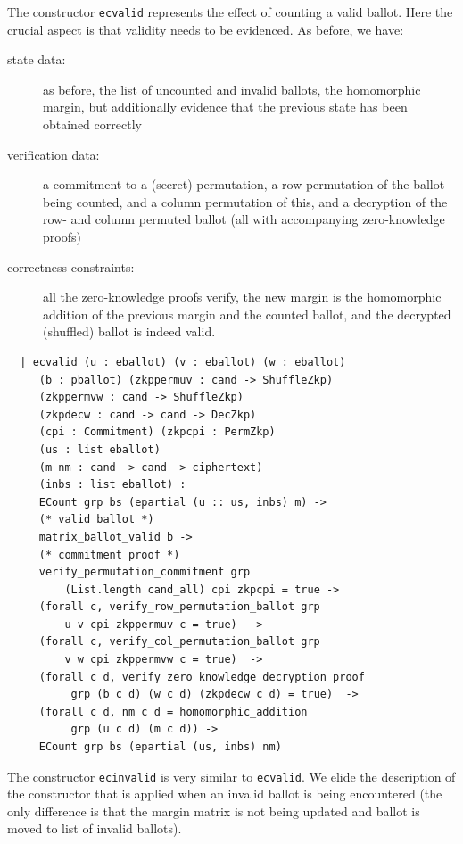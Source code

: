 The constructor \texttt{ecvalid} represents the effect of counting a
valid ballot. Here the crucial aspect is that validity needs to be
evidenced. As before, we have:
\begin{description}
  \item[state data:] as before, the list of uncounted and invalid
  ballots, the homomorphic margin, but additionally evidence that
  the previous state has been obtained correctly
  \item[verification data:]
  a commitment to a (secret) permutation, a row permutation of the
  ballot being counted, and a column permutation of this, and a
  decryption of the row- and column permuted ballot (all with
  accompanying zero-knowledge proofs)
  \item[correctness constraints:] all the zero-knowledge proofs
  verify, the new margin is the homomorphic addition of the previous
  margin and the counted ballot, and the decrypted (shuffled)
  ballot is indeed valid. 
\end{description}

\begin{verbatim}
  | ecvalid (u : eballot) (v : eballot) (w : eballot)
     (b : pballot) (zkppermuv : cand -> ShuffleZkp)
     (zkppermvw : cand -> ShuffleZkp) 
     (zkpdecw : cand -> cand -> DecZkp)
     (cpi : Commitment) (zkpcpi : PermZkp)
     (us : list eballot) 
     (m nm : cand -> cand -> ciphertext)
     (inbs : list eballot) :
     ECount grp bs (epartial (u :: us, inbs) m) ->
     (* valid ballot *)
     matrix_ballot_valid b ->
     (* commitment proof *)
     verify_permutation_commitment grp 
         (List.length cand_all) cpi zkpcpi = true ->
     (forall c, verify_row_permutation_ballot grp 
         u v cpi zkppermuv c = true)  ->
     (forall c, verify_col_permutation_ballot grp 
         v w cpi zkppermvw c = true)  ->
     (forall c d, verify_zero_knowledge_decryption_proof 
          grp (b c d) (w c d) (zkpdecw c d) = true)  ->
     (forall c d, nm c d = homomorphic_addition
          grp (u c d) (m c d)) -> 
     ECount grp bs (epartial (us, inbs) nm)
       \end{verbatim}
 
  

The constructor \texttt{ecinvalid}  is very similar to \texttt{ecvalid}.  
We elide the description of the constructor that is applied
when an invalid ballot is being encountered (the only
difference is that the margin matrix is not being updated and ballot is moved to 
list of invalid ballots). 

